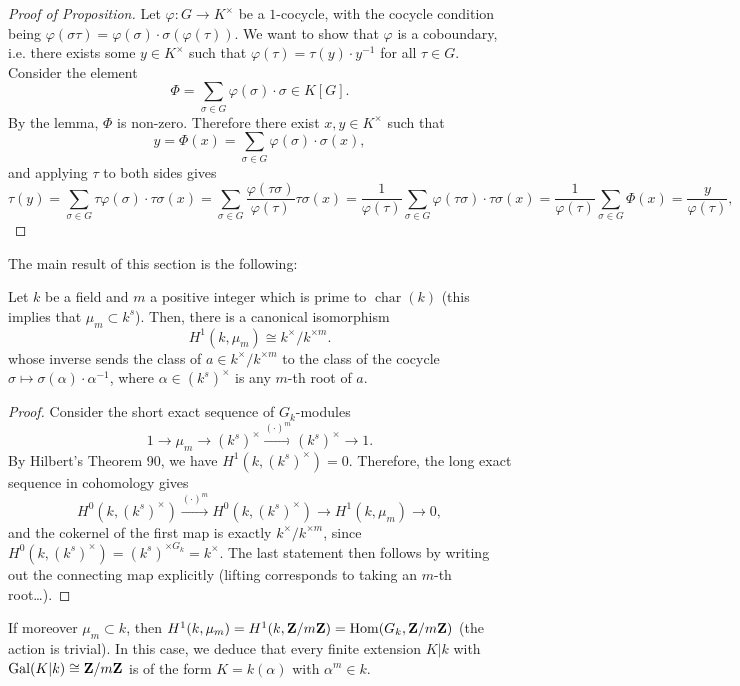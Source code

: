 \documentclass{article}
\begin{document}
\begin{proof}[Proof of Proposition]
		Let $\varphi:G\to K^\times$ be a $1$-cocycle, with the cocycle condition being $\varphi(\sigma\tau) = \varphi(\sigma)\cdot\sigma(\varphi(\tau))$. We want to show that $\varphi$ is a coboundary, i.e. there exists some $y\in K^\times$ such that $\varphi(\tau) = \tau(y)\cdot y^{-1}$ for all $\tau\in G$. Consider the element
		\[
			\Phi = \sum_{\sigma\in G} \varphi(\sigma)\cdot\sigma \in K[G].
		\]
		By the lemma, $\Phi$ is non-zero. Therefore there exist $x,y\in K^\times$ such that
		\[
			y= \Phi(x)= \sum_{\sigma\in G} \varphi(\sigma)\cdot\sigma(x),
		\]
		and applying $\tau$ to both sides gives
		\[
			\tau(y) = \sum_{\sigma\in G} \tau \varphi(\sigma)\cdot\tau\sigma(x) = \sum_{\sigma\in G} \frac{\varphi(\tau\sigma)}{\varphi(\tau)}\tau\sigma(x)= \frac{1}{\varphi(\tau)}\sum_{\sigma\in G} \varphi(\tau\sigma)\cdot\tau\sigma(x) = \frac{1}{\varphi(\tau)}\sum_{\sigma\in G} \Phi(x)= \frac{y}{\varphi(\tau)},
		\]
\end{proof}
The main result of this section is the following:
\begin{prop}
		Let $k$ be a field and $m$ a positive integer which is prime to $\operatorname{char}(k)$ (this implies that $\mu_m\subset k^s$). Then, there is a canonical isomorphism
		\[
			H^1(k,\mu_m) \cong k^\times/k^{\times m}.
		\]	
		whose inverse sends the class of $a\in k^\times/k^{\times m}$ to the class of the cocycle $\sigma \mapsto \sigma(\alpha)\cdot \alpha^{-1}$, where $\alpha\in (k^s)^\times$ is any $m$-th root of $a$.
\end{prop}
\begin{proof}
		Consider the short exact sequence of $G_k$-modules
		\[
			1 \to \mu_m \to (k^s)^\times \xrightarrow{(\cdot)^m} (k^s)^\times \to 1.
		\]
		By Hilbert's Theorem 90, we have $H^1(k,(k^s)^\times)=0$. Therefore, the long exact sequence in cohomology gives
		\[
			H^0(k,(k^s)^\times) \xrightarrow{(\cdot)^m} H^0(k,(k^s)^\times) \to H^1(k,\mu_m) \to 0,
		\]
		and the cokernel of the first map is exactly $k^\times/k^{\times m}$, since $H^0(k,(k^s)^\times) = (k^s)^{\times G_k} = k^\times$. The last statement then follows by writing out the connecting map explicitly (lifting corresponds to taking an $m$-th root\ldots).
\end{proof}
\begin{exmp}
		If moreover $\mu_m\subset k$, then $H^1(k,\mu_m) = H^1(k,\mathbf{Z}/m\mathbf{Z})=\operatorname{Hom}(G_k,\mathbf{Z}/m\mathbf{Z})$ (the action is trivial). In this case, we deduce that every finite extension $K|k$ with $\operatorname{Gal}(K|k)\cong \mathbf{Z}/m\mathbf{Z}$ is of the form $K=k(\alpha)$ with $\alpha^m\in k$.
\end{exmp}
\end{document}
